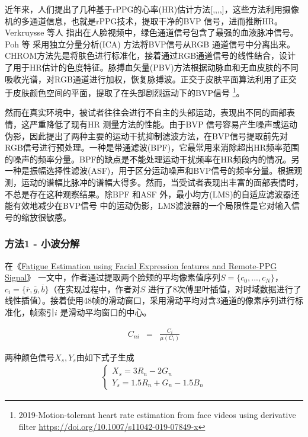 近年来，人们提出了几种基于rPPG的心率(HR)估计方法[\cite{6523142},\cite{de2014improved},\cite{poh2010non},\cite{verkruysse2008remote},\cite{wang2016algorithmic}]，这些方法利用摄像机的多通道信息，也就是rPPG技术，提取干净的BVP 信号，进而推断HR。Verkruysse 等人\cite{verkruysse2008remote} 指出在人脸视频中，绿色通道信号包含了最强的血液脉冲信号。Poh 等\cite{poh2010non} 采用独立分量分析(ICA) 方法将BVP信号从RGB 通道信号中分离出来。CHROM\cite{6523142}方法先是将肤色进行标准化，接着通过RGB通道信号的线性结合，设计了用于HR估计的色度特征。脉搏血矢量(PBV)方法\cite{de2014improved}根据动脉血和无血皮肤的不同吸收光谱，对RGB通道进行加权，恢复脉搏波。正交于皮肤平面\cite{wang2016algorithmic}算法利用了正交于皮肤颜色空间的平面，提取了在头部剧烈运动下的BVP信号
\footnote{2019-Motion-tolerant heart rate estimation from face videos using derivative filter \quad \url{https://doi.org/10.1007/s11042-019-07849-x}}。

然而在真实环境中，被试者往往会进行不自主的头部运动，表现出不同的面部表情，这严重降低了现有HR 测量方法的性能。由于BVP 信号容易产生噪声或运动伪影，因此提出了两种主要的运动干扰抑制滤波方法，在BVP信号提取前先对RGB信号进行预处理。一种是带通滤波(BPF)，它最常用来消除超出HR频率范围的噪声的频率分量。BPF的缺点是不能处理运动干扰频率在HR频段内的情况。另一种是振幅选择性滤波(ASF)\cite{wang2017amplitude}，用于区分运动噪声和BVP信号的频率分量。根据观测，运动的谱幅比脉冲的谱幅大得多。然而，当受试者表现出丰富的面部表情时，不总是存在这种观察结果。除BPF 和ASF 外，最小均方(LMS)的自适应滤波器还能有效地减少在BVP信号\cite{liu2018self} 中的运动伪影，LMS滤波器的一个局限性是它对输入信号的缩放很敏感。

\subsubsection{方法1 - 小波分解}

在《\href{https://ieeexplore.ieee.org/abstract/document/8956411}{Fatigue Estimation using Facial Expression features and Remote-PPG Signal}》 一文中，作者通过提取两个脸颊的平均像素值序列$S = \{c_0, . . . , c_N \}$，$c_i = \{\overline{r}, \overline{g}, \overline{b}\}$（在实现过程中，作者对$S$ 进行了8次傅里叶插值，对时域数据进行了线性插值）。接着使用48帧的滑动窗口，采用滑动平均对含3通道的像素序列进行标准化，帧索引$i$ 是滑动平均窗口的中心。

\begin{eqnarray}
C_{ni} & = & \frac{C_i}{\mu(C_i)}
\end{eqnarray}

两种颜色信号$X_s,Y_s$由如下式子生成
\begin{align}
\begin{cases}
X_s = 3R_n - 2G_n \\
Y_s = 1.5R_n + G_n - 1.5B_n
\end{cases}
\end{align}

